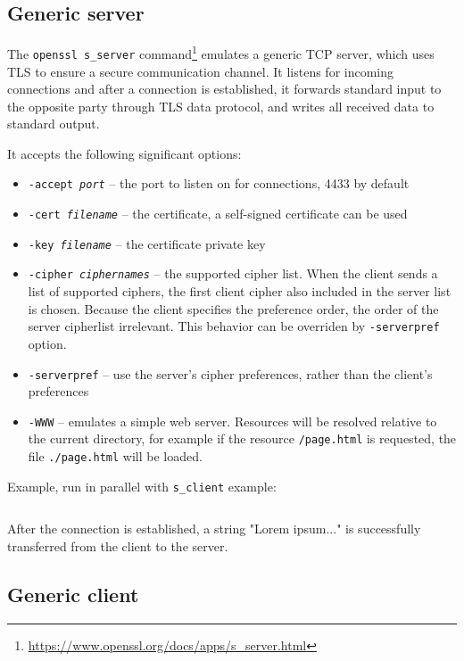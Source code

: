 \inputminted{text}{code/openssl-speed-example.txt}


\subsection{Generic server}
\label{toc/openssl-s_server}

The \texttt{openssl s\_server} command\footnote{\url{https://www.openssl.org/docs/apps/s\_server.html}} emulates a generic TCP server, which uses TLS to ensure a secure communication channel. It listens for incoming connections and after a connection is established, it forwards standard input to the opposite party through TLS data protocol, and writes all received data to standard output.

It accepts the following significant options:

\begin{itemize}
  \item \texttt{-accept \textit{port}} -- the port to listen on for connections, 4433 by default
  \item \texttt{-cert \textit{filename}} -- the certificate, a self-signed certificate can be used
  \item \texttt{-key \textit{filename}} -- the certificate private key
  \item \texttt{-cipher \textit{ciphernames}} -- the supported cipher list. When the client sends a list of supported ciphers, the first client cipher also included in the server list is chosen. Because the client specifies the preference order, the order of the server cipherlist irrelevant. This behavior can be overriden by \texttt{-serverpref} option.
  \item \texttt{-serverpref} -- use the server's cipher preferences, rather than the client's preferences
  \item \texttt{-WWW} -- emulates a simple web server. Resources will be resolved relative to the current directory, for example if the resource \texttt{/page.html} is requested, the file \texttt{./page.html} will be loaded.
\end{itemize}

Example, run in parallel with \texttt{s\_client} example:

\inputminted{text}{code/openssl-s_server-example.txt}

After the connection is established, a string "Lorem ipsum..." is successfully transferred from the client to the server.


\subsection{Generic client}
\label{toc/openssl-s_client}


